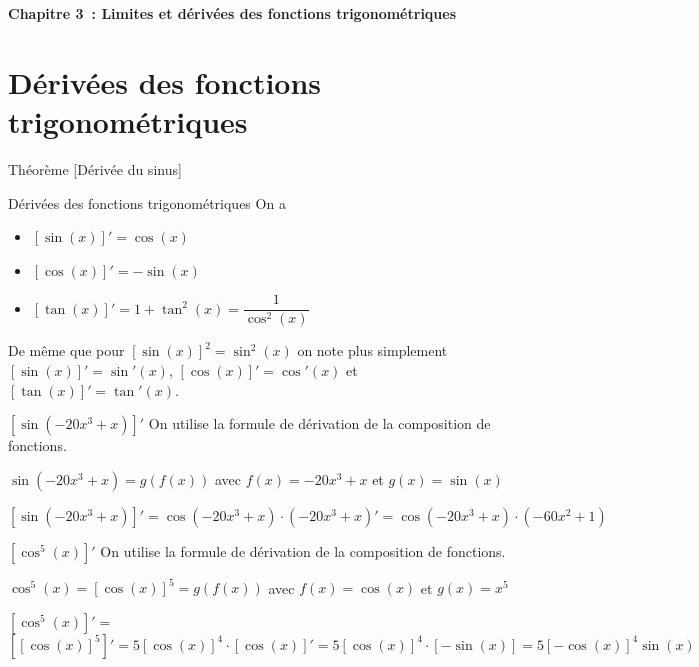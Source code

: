 \documentclass[a4paper,12pt]{article}
\begin{document}
\setlength{\cftbeforesecskip}{2pt}

\setlength{\cftsecindent}{1em}

\begin{center}
	{\bfseries \Huge Chapitre 3~: Limites et dérivées des fonctions trigonométriques}
\end{center}

\bigskip

\tableofcontents
\newpage
\section{Dérivées des fonctions trigonométriques}
Théorème [Dérivée du sinus]
\begin{thm}
Dérivées des fonctions trigonométriques
\tcblower
On a 
\begin{itemize}
	\item $[\sin(x)]' = \cos(x)$
	\item $[\cos(x)]' = -\sin(x)$
	\item $[\tan(x)]' = 1 + \tan^2(x) = \dfrac{1}{\cos^2(x)}$
\end{itemize}
\end{thm}


\begin{notation}
	\tcblower
De même que pour $[\sin(x)]^2 = \sin^2(x)$ on note plus simplement $[\sin(x)]' = \sin'(x)$, $[\cos(x)]' = \cos'(x)$ et $[\tan(x)]' = \tan'(x)$.
\end{notation}
\begin{exemple}
	$[\sin(-20x^3 + x)]'$
	\tcblower
On utilise la formule de dérivation de la composition de fonctions. 

$\sin(-20x^3 + x) = g(f(x))$ avec $f(x) = -20x^3 + x$ et $g(x) = \sin(x)$

$[\sin(-20x^3 + x)]' = \cos(-20x^3 + x) \cdot (-20x^3 + x)' = \cos(-20x^3 + x) \cdot (-60x^2 + 1)$


\end{exemple}

\begin{exemple}
	$[\cos^5(x)]'$
	\tcblower
On utilise la formule de dérivation de la composition de fonctions. 

$\cos^5(x) = [\cos(x)]^5 = g(f(x))$ avec $f(x) = \cos(x)$ et $g(x) = x^5$

$[\cos^5(x)]' =$
$[[\cos(x)]^5]' = 5[\cos(x)]^4 \cdot [\cos(x)]' = 5[\cos(x)]^4 \cdot [-\sin(x)] = 5[-\cos(x)]^4 \sin(x)$
\end{exemple}
\end{document}
